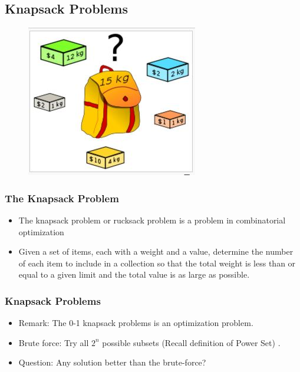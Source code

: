 \documentclass{beamer}
\begin{document}
\subsection{Knapsack Problems}

\begin{frame}
\begin{figure}
\centering
\includegraphics[width=0.9\linewidth]{knapsack}
\caption{}
\label{fig:knapsack}
\end{figure}
\end{frame}
\begin{frame}
	\frametitle{The Knapsack Problem}
\Large
\begin{itemize}
\item The knapsack problem or rucksack problem is a problem in combinatorial optimization
\item Given a set of items, each with a weight and a value, determine the number of each item to include in a collection so that the total weight is less than or equal to a given limit and the total value is as large as possible.
\end{itemize}
	
\end{frame}
\begin{frame}
	\frametitle{Knapsack Problems}
	\Large
	\begin{itemize}
		\item Remark: The 0-1 knapsack problems is an optimization problem.
		\item Brute force: Try all $2^n$ possible subsets (Recall definition of Power Set)
		.
		\item	Question: Any solution better than the brute-force?
	\end{itemize}
\end{frame}
\end{document}
